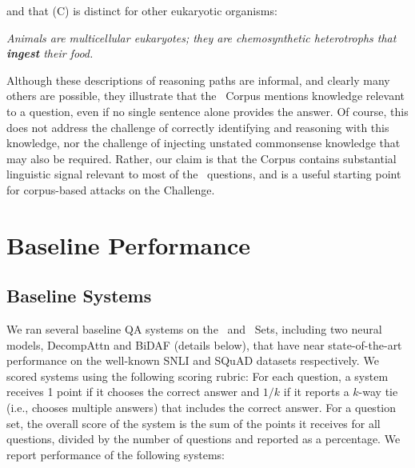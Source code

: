 and that (C) is distinct for other eukaryotic organisms:

\begin{ite}
\item {\it Animals are multicellular eukaryotes; they are chemosynthetic heterotrophs that \textbf{\textit{ingest}} their food.}
\end{ite}

Although these descriptions of reasoning paths are informal, and clearly many others are possible, they illustrate that the \ASC~Corpus mentions knowledge relevant to a question, even if no single sentence alone provides the answer. Of course, this does not address the challenge of correctly identifying and reasoning with this knowledge, nor the challenge of injecting unstated commonsense knowledge that may also be required. Rather, our claim is that the Corpus contains substantial linguistic signal relevant to most of the \ASC~questions, and is a useful starting point for corpus-based attacks on the Challenge.

\section{Baseline Performance}

\subsection{Baseline Systems}

We ran several baseline QA systems on the \Challenge~and \Additional~Sets, including two neural models, DecompAttn and BiDAF (details below), that have near state-of-the-art performance on the well-known SNLI and SQuAD datasets respectively. We scored systems using the following scoring rubric: For each question, a system receives 1 point if it chooses the correct answer and $1/k$ if it reports a $k$-way tie (i.e., chooses multiple answers) that includes the correct answer. For a question set, the overall score of the system is the sum of the points it receives for all questions, divided by the number of questions and reported as a percentage. We report performance of the following systems:

